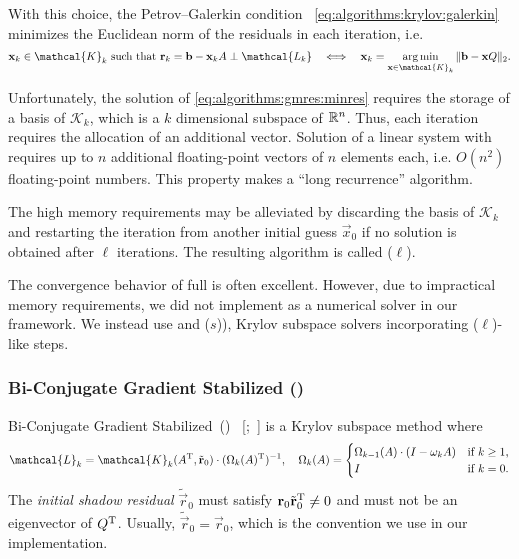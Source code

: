 With this choice, the Petrov--Galerkin condition~%
\eqref{eq:algorithms:krylov:galerkin} minimizes the Euclidean norm of
the residuals in each iteration, i.e.
\begin{equation}
  \label{eq:algorithms:gmres:minres}
  \vec{x}_k \in \mathcal{K}_k \text{ such that } \vec{r}_k = \vec{b} - \vec{x}_k A \perp
  \mathcal{L_k} \quad\Longleftrightarrow\quad \vec{x}_k = \argmin_{\vec{x} \in
    \mathcal{K}_k} \| \vec{b} - \vec{x} Q \|_2 \text.
\end{equation}

Unfortunately, the solution of \cref{eq:algorithms:gmres:minres}
requires the storage of a basis of $\mathcal{K}_k$, which is a $k$
dimensional subspace of $\mathbb{R}^n$. Thus, each iteration requires the
allocation of an additional vector. Solution of a linear system with
 requires up to $n$ additional floating-point vectors of
$n$ elements each, i.e. $O(n^2)$ floating-point numbers. This property
makes  a ``long recurrence'' algorithm.

The high memory requirements may be alleviated by discarding the basis
of $\mathcal{K}_k$ and restarting the iteration from another initial
guess $\vec{x}_0$ if no solution is obtained after $\ell$
iterations. The resulting algorithm is called ($\ell$).

The convergence behavior of full  is often
excellent. However, due to impractical memory requirements, we did not
implement  as a numerical solver in our framework.  We
instead use  and
($s$)), Krylov subspace solvers
incorporating ($\ell$)-like steps.

\subsubsection{Bi-Conjugate Gradient Stabilized ()}
\label{ssec:algorithms:bicgstab}

Bi-Conjugate Gradient Stabilized~()%
~\mkbibbrackets{;~}
is a Krylov subspace method where~\citep{simoncini2010interpreting}
\begin{equation}
  \label{eq:algorithms:bicgstab:stabpoly}
  \mathcal{L}_k = \mathcal{K}_k(A^\T, \tilde{\vec{r}}_0) \cdot
  (\Omega_k(A)^\T)^{-1}, \quad
  \Omega_k(A) = \begin{cases}
    \Omega_{k - 1}(A) \cdot (I - \omega_k A) & \text{if $k \ge 1$,} \\
    I & \text{if $k = 0$.}
  \end{cases}
\end{equation}
The \emph{initial shadow residual} $\tilde{\vec{r}}_0$ must satisfy
$\bm{\mathrm{r}}_0 \tilde{\bm{\mathrm{r}}}_0^{\mathrm{T}} \ne 0$ and must not be an eigenvector
of $Q^{\mathrm{T}}$. Usually, $\tilde{\vec{r}}_0 = \vec{r}_0$, which is the
convention we use in our implementation.


